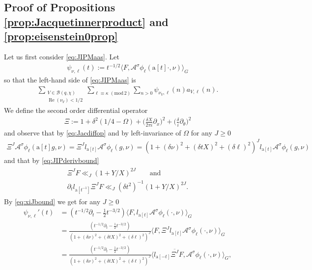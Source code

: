 \documentclass[12pt]{amsart}
\theoremstyle{definition}
\theoremstyle{remark}
\numberwithin{equation}{section}
\newcommand{\B}{\mathcal{B}}
\newcommand{\1}{{\mathbf 1}}
\renewcommand{\Re}{\operatorname{Re}}
\renewcommand{\a}{\mathrm{a}}
\renewcommand{\pmod}[1]{\,\,(\mathrm{mod}\,{#1})}
\begin{document}
\subsection{Proof of Propositions \ref{prop:Jacquetinnerproduct} and \ref{prop:eisenstein0prop}}
Let us first consider \eqref{eq:JIPMaas}.
    Let \begin{align*}
        \psi_{\nu,\ell}(t) := t^{-1/2} \langle F, \mathcal{A}^{\sigma} \phi_\ell(\mathrm{a}[t] \cdot,\nu) \rangle_{G}
    \end{align*}
    so that the left-hand side of \eqref{eq:JIPMaas} is
    \begin{align*}
     \sum_{\substack{V \in \B(q,\chi) \\ \Re(\nu_V) < 1/2}} \sum_{\ell \equiv \kappa \pmod{2}}  \sum_{n > 0} 
\psi_{\nu_V,\ell}(n) a_{V,\ell}(n).
    \end{align*}
We define the second order differential operator
\begin{align*}
    \Xi:= 1+\delta^2(1/4-\Omega) + \bigg( \frac{\delta X}{2 \pi i} \partial_x\bigg)^2 +  \bigg( \frac{\delta }{ i} \partial_\theta\bigg)^2
\end{align*}
and observe that  by \eqref{eq:Jacdiffop} and by left-invariance of $\Omega$  for any $J\geq 0$
\begin{align} \label{eq:xiJbound}
  \Xi^J   \mathcal{A}^{\sigma} \phi_\ell(\a[t] g,\nu) = \Xi^J l_{\a[t]}  \mathcal{A}^{\sigma} \phi_\ell( g,\nu)  = (1+(\delta \nu)^2 + (\delta t X)^2 + (\delta\ell)^2)^J l_{\a[t]}\mathcal{A}^{\sigma} \phi_\ell( g,\nu)  
\end{align}
and that by \eqref{eq:JIPderivbound} 
\begin{align} \label{eq:xi0bound}
     \begin{split}
         \Xi^J F \ll_J (1 +Y/X)^{2J} \quad \quad \text{and} \\
 \partial_t l_{\a[t^{-1}]}  \Xi^J F \ll_J (\delta t^2)^{-1} (1 +Y/X)^{2J}.
     \end{split} 
\end{align}
By \eqref{eq:xiJbound} we get for any $J\geq 0$
\begin{align*}
    \psi_{\nu,\ell}'(t) &= (t^{-1/2} \partial_t- \tfrac{1}{2} t^{-3/2}) \langle F, l_{\a[t]}\mathcal{A}^{\sigma} \phi_\ell( \cdot,\nu) \rangle_{G} \\
    &= \frac{(t^{-1/2} \partial_t- \tfrac{1}{2} t^{-3/2})}{(1+(\delta \nu)^2 + (\delta t X)^2 + (\delta\ell)^2)^J } \langle F, \Xi^J l_{\a[t]}\mathcal{A}^{\sigma} \phi_\ell( \cdot,\nu) \rangle_{G} \\
    &=  \frac{(t^{-1/2} \partial_t- \tfrac{1}{2} t^{-3/2})}{(1+(\delta \nu)^2 + (\delta t X)^2 + (\delta\ell)^2)^J } \langle  l_{\a[-t]}\overline{\Xi^J} F,  \mathcal{A}^{\sigma} \phi_\ell( \cdot,\nu) \rangle_{G},
 \end{align*}
\end{document}
